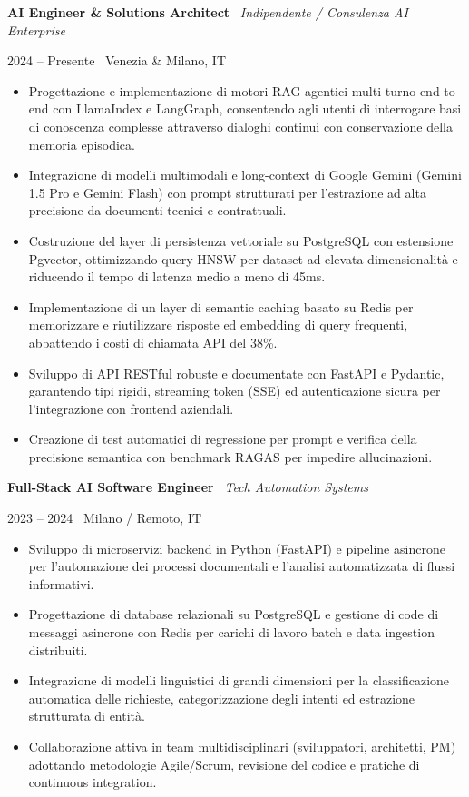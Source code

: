 \documentclass[a4paper,10pt]{article}
\newcommand{\role}[4]{%
  \vspace{2pt}\noindent
  \begin{minipage}[t]{0.70\textwidth}\raggedright\textbf{#1} \textbullet\ \textit{#3}\end{minipage}%
  \hfill
  \begin{minipage}[t]{0.28\textwidth}\raggedleft\footnotesize\color{gray}#2 \textbullet\ #4\end{minipage}%
  \vspace{1pt}%
}
\begin{document}
\role{AI Engineer \& Solutions Architect}{2024 -- Presente}{Indipendente / Consulenza AI Enterprise}{Venezia \& Milano, IT}
\begin{itemize}
  \item Progettazione e implementazione di motori RAG agentici multi-turno end-to-end con LlamaIndex e LangGraph, consentendo agli utenti di interrogare basi di conoscenza complesse attraverso dialoghi continui con conservazione della memoria episodica.
  \item Integrazione di modelli multimodali e long-context di Google Gemini (Gemini 1.5 Pro e Gemini Flash) con prompt strutturati per l'estrazione ad alta precisione da documenti tecnici e contrattuali.
  \item Costruzione del layer di persistenza vettoriale su PostgreSQL con estensione Pgvector, ottimizzando query HNSW per dataset ad elevata dimensionalità e riducendo il tempo di latenza medio a meno di 45ms.
  \item Implementazione di un layer di semantic caching basato su Redis per memorizzare e riutilizzare risposte ed embedding di query frequenti, abbattendo i costi di chiamata API del 38\%.
  \item Sviluppo di API RESTful robuste e documentate con FastAPI e Pydantic, garantendo tipi rigidi, streaming token (SSE) ed autenticazione sicura per l'integrazione con frontend aziendali.
  \item Creazione di test automatici di regressione per prompt e verifica della precisione semantica con benchmark RAGAS per impedire allucinazioni.
\end{itemize}

\vspace{3pt}
\role{Full-Stack AI Software Engineer}{2023 -- 2024}{Tech Automation Systems}{Milano / Remoto, IT}
\begin{itemize}
  \item Sviluppo di microservizi backend in Python (FastAPI) e pipeline asincrone per l'automazione dei processi documentali e l'analisi automatizzata di flussi informativi.
  \item Progettazione di database relazionali su PostgreSQL e gestione di code di messaggi asincrone con Redis per carichi di lavoro batch e data ingestion distribuiti.
  \item Integrazione di modelli linguistici di grandi dimensioni per la classificazione automatica delle richieste, categorizzazione degli intenti ed estrazione strutturata di entità.
  \item Collaborazione attiva in team multidisciplinari (sviluppatori, architetti, PM) adottando metodologie Agile/Scrum, revisione del codice e pratiche di continuous integration.
\end{itemize}
\end{document}
